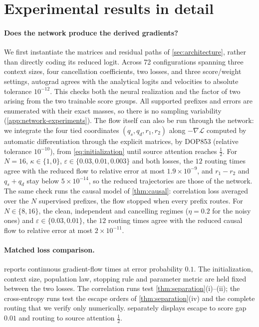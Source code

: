 \section{Experimental results in detail}
\label{app:experiments}
\paragraph{Does the network produce the derived gradients?}
We first instantiate the matrices and residual paths of \cref{sec:architecture}, rather than directly coding its reduced logit.
Across 72 configurations spanning three context sizes, four cancellation coefficients, two losses, and three score/weight settings,
autograd agrees with the analytical logits and velocities to absolute tolerance $10^{-12}$.
This checks both the neural realization and the factor of two arising from the two trainable score groups.
All supported prefixes and errors are enumerated with their exact masses, so there is no sampling variability (\cref{app:network-experiments}).
The flow itself can also be run through the network: we integrate the four tied coordinates $(q_s,q_d,r_1,r_2)$ along
$-\nabla\mathcal L$ computed by automatic differentiation through the explicit matrices, by DOP853 (relative tolerance $10^{-10}$), from \cref{eq:initialization} until
source attention reaches $\tfrac12$. For $N=16$, $\kappa\in\{1,0\}$, $\varepsilon\in\{0.03,0.01,0.003\}$ and both losses, the $12$ routing times agree with the reduced
flow to relative error at most $1.9\times10^{-9}$, and $r_1-r_2$ and $q_s+q_d$ stay below $5\times10^{-14}$, so the reduced trajectories are those of the network.
The same check runs the causal model of \cref{thm:causal}: correlation loss averaged over the $N$ supervised prefixes, the flow stopped when every prefix routes.
For $N\in\{8,16\}$, the clean, independent and cancelling regimes ($\eta=0.2$ for the noisy ones) and $\varepsilon\in\{0.03,0.01\}$, the $12$ routing times agree with the reduced
causal flow to relative error at most $2\times10^{-11}$.

\paragraph{Matched loss comparison.}
 reports continuous gradient-flow times at error probability $0.1$.
The initialization, context size, population law, stopping rule and parameter metric are held fixed between the two losses.
The correlation runs test \cref{thm:separation}(i)--(ii); the cross-entropy runs test the escape orders of \cref{thm:separation}(iv)
and the complete routing that we verify only numerically.
 separately displays escape to score gap $0.01$ and routing to source attention $\tfrac{1}{2}$.

